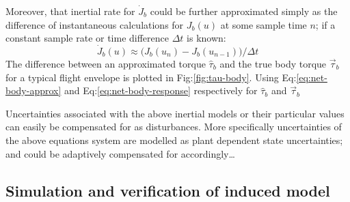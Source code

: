 \par
Moreover, that inertial rate for $\dot{J}_b$ could be further approximated simply as the difference of instantaneous calculations for $J_b(u)$ at some sample time $n$; if a constant sample rate or time difference $\Delta t$ is known:
\begin{equation}
\dot{J}_b(u)\approx \big(J_b(u_n)-J_b(u_{n-1})\big)/\Delta t
\end{equation}
The difference between an approximated torque $\hat{\tau}_b$ and the true body torque $\vec{\tau}_b$ for a typical flight envelope is plotted in Fig:\ref{fig:tau-body}. Using Eq:\ref{eq:net-body-approx} and Eq:\ref{eq:net-body-response} respectively for $\hat{\tau}_b$ and $\vec{\tau}_b$ 
\par
Uncertainties associated with the above inertial models or their particular values can easily be compensated for as disturbances. More specifically uncertainties of the above equations system are modelled as plant dependent state uncertainties; and could be adaptively compensated for accordingly\ldots
\subsection{Simulation and verification of induced model}
\label{subsec:dynamics.nonlinearities.torque-tests}
